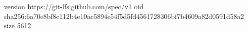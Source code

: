 version https://git-lfs.github.com/spec/v1
oid sha256:6a70e8bf8c112b4e10ac5894e54f5d5fd4561728306bf7b4609a82d0591d58a2
size 5612

